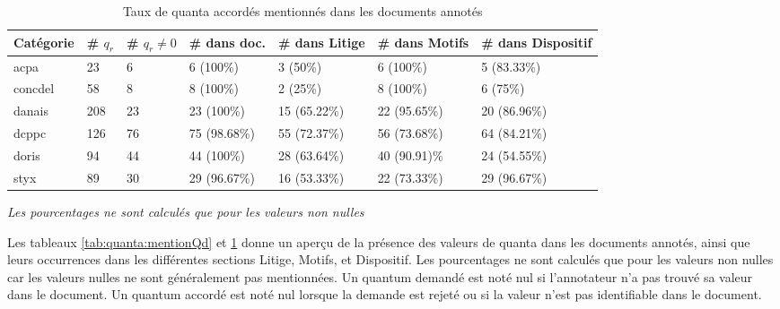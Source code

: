 \begin{table}[!htb]
	\scriptsize
	\begin{tabular}{|l|l|l|l|l|l|l|}
		\hline
		\textbf{Catégorie} & \textbf{\# $q_r$} & \textbf{\# $q_r\neq 0$} & \textbf{\# dans doc.} & \textbf{\# dans Litige} & \textbf{\# dans Motifs} & \textbf{\# dans Dispositif} \\ \hline
		acpa               & 23                & 6                       & 6 (100\%)             & 3 (50\%)                & 6 (100\%)               & 5 (83.33\%)                 \\ \hline
		concdel            & 58                & 8                       & 8 (100\%)             & 2 (25\%)                & 8 (100\%)               & 6 (75\%)                    \\ \hline
		danais             & 208               & 23                      & 23 (100\%)            & 15 (65.22\%)            & 22 (95.65\%)            & 20 (86.96\%)                \\ \hline
		dcppc              & 126               & 76                      & 75 (98.68\%)          & 55 (72.37\%)            & 56 (73.68\%)            & 64 (84.21\%)                \\ \hline
		doris              & 94                & 44                      & 44 (100\%)            & 28 (63.64\%)            & 40 (90.91)\%            & 24 (54.55\%)                \\ \hline
		styx               & 89                & 30                      & 29 (96.67\%)          & 16 (53.33\%)            & 22 (73.33\%)            & 29 (96.67\%)                \\ \hline
	\end{tabular}
\textit{Les pourcentages ne sont calculés que pour les valeurs non nulles}
\caption{Taux de quanta accordés mentionnés dans les documents annotés} \label{tab:quanta:mentionQr}
\end{table}

Les tableaux \ref{tab:quanta:mentionQd} et \ref{tab:quanta:mentionQr} donne un aperçu de la présence des valeurs de quanta dans les documents annotés, ainsi que leurs occurrences dans les différentes sections Litige, Motifs, et Dispositif. Les pourcentages ne sont calculés que pour les valeurs non nulles car les valeurs nulles ne sont généralement pas mentionnées. Un quantum demandé est noté nul si l'annotateur n'a pas trouvé sa valeur dans le document. Un quantum accordé est noté nul lorsque la demande est rejeté ou si la valeur n'est pas identifiable dans le document.

